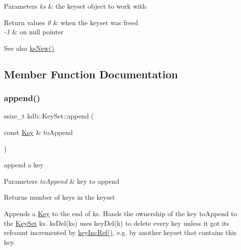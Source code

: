 \begin{DoxyParams}{Parameters}
{\em ks} & the keyset object to work with \\
\hline
\end{DoxyParams}

\begin{DoxyRetVals}{Return values}
{\em 0} & when the keyset was freed \\
\hline
{\em -\/1} & on null pointer \\
\hline
\end{DoxyRetVals}
\begin{DoxySeeAlso}{See also}
\mbox{\hyperlink{group__keyset_ga671e1aaee3ae9dc13b4834a4ddbd2c3c}{ks\+New()}} 
\end{DoxySeeAlso}


\subsection{Member Function Documentation}
\mbox{\label{classkdb_1_1KeySet_a0d4b2f3aa9f58d10053561135b50233e}} 
\subsubsection{\texorpdfstring{append()}{append()}\hspace{0.1cm}{\footnotesize\ttfamily [1/2]}}
{\footnotesize\ttfamily ssize\+\_\+t kdb\+::\+Key\+Set\+::append (\begin{DoxyParamCaption}\item[{const \mbox{\hyperlink{classkdb_1_1Key}{Key}} \&}]{to\+Append }\end{DoxyParamCaption})\hspace{0.3cm}{\ttfamily [inline]}}



append a key 


\begin{DoxyParams}{Parameters}
{\em to\+Append} & key to append\\
\hline
\end{DoxyParams}
\begin{DoxyReturn}{Returns}
number of keys in the keyset
\end{DoxyReturn}
Appends a \mbox{\hyperlink{classkdb_1_1Key}{Key}} to the end of {\ttfamily ks}. Hands the ownership of the key {\ttfamily to\+Append} to the \mbox{\hyperlink{classkdb_1_1KeySet}{Key\+Set}} {\ttfamily ks}. ks\+Del(ks) uses key\+Del(k) to delete every key unless it got its refcount incremented by \mbox{\hyperlink{group__key_ga6970a6f254d67af7e39f8e469bb162f1}{key\+Inc\+Ref()}}, e.\+g. by another keyset that contains this key.

